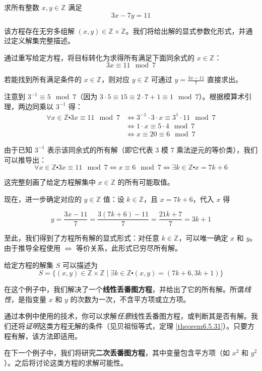 \begin{example}\label{ex:example6.5.26}
    求所有整数 $x, y \in \mathbb{Z}$ 满足
    \[3x - 7y = 11\]

    该方程存在无穷多组解 $(x, y) \in \mathbb{Z} \times \mathbb{Z}$。我们将给出解的显式参数化形式，并通过定义解集完整描述。

    通过重写给定方程，将目标转化为求得所有满足下面同余式的 $x \in \mathbb{Z}$：
    \[3x \equiv 11 \mod 7\]

    若能找到所有满足条件的 $x \in \mathbb{Z}$，则对应 $y \in \mathbb{Z}$ 可通过 $y = \frac{3x-11}{7}$ 直接求出。

    注意到 $3^{-1} \equiv 5 \mod 7$（因为 $3 \cdot 5 \equiv 15 \equiv 2 \cdot 7 + 1 \equiv 1 \mod 7$）。根据模算术引理，两边同乘以 $3^{-1}$ 得：
    \begin{align*}
        \forall x \in \mathbb{Z} \centerdot 3x \equiv 11 \mod 7 &\iff 3^{-1} \cdot 3 \cdot x \equiv 3^{1}
\cdot 11 \mod 7 \\
        &\iff 1 \cdot x \equiv 5 \cdot 4 \mod 7 \\
        &\iff x \equiv 20 \equiv 6 \mod 7
    \end{align*}

    由于已知 $3^{-1}$ 表示该同余式的所有解（即它代表 $3$ 模 $7$ 乘法逆元的等价类），我们可以推导出：
    \[\forall x \in \mathbb{Z} \centerdot 3x \equiv 11 \mod 7 \iff x \equiv 6 \mod 7 \iff \exists k \in \mathbb{Z} \centerdot x = 7k + 6\]

    这完整刻画了给定方程解集中 $x \in \mathbb{Z}$ 的所有可能取值。

    现在，进一步确定对应的 $y \in \mathbb{Z}$ 值：设 $k \in \mathbb{Z}$，且 $x = 7k + 6$，代入 $x$ 得

    \[y = \frac{3x-11}{7} = \frac{3(7k + 6)-11}{7} = \frac{21k+7}{7} = 3k+1\]

    至此，我们得到了方程所有解的显式形式：对任意 $k \in \mathbb{Z}$，可以唯一确定 $x$ 和 $y$。由于推导全程使用 $\iff$ 等价关系，此形式已穷尽所有解。

    给定方程的解集 $S$ 可以描述为
    \[S = \{(x, y) \in \mathbb{Z} \times \mathbb{Z} \mid \exists k \in \mathbb{Z} \centerdot (x, y) = (7k + 6, 3k + 1)\}\]
\end{example}

\begin{tcolorbox}[colback=gray!10,
    colframe=black,
    width=\textwidth,
    arc=2mm, auto outer arc,
    title={有趣的事实},breakable,enhanced jigsaw,
    before upper={\parindent15pt\noindent},	]
    在这个例子中，我们解决了一个\textbf{线性丢番图方程}，并给出了它的所有解。所谓\emph{线性}，是指变量 $x$ 和 $y$ 的次数为一次，不含平方项或立方项。

    通过本例中使用的技术，你可以求解\emph{任意}线性丢番图方程，或判断其是否有解。我们还将\emph{证明}这类方程无解的条件（见贝祖恒等式，定理 \ref{theorem6.5.31}）。只要方程有解，该方法即适用。

    在下一个例子中，我们将研究\textbf{二次丢番图方程}，其中变量包含平方项（如 $x^2$ 和 $y^2$）。之后将讨论这类方程的求解可能性。
\end{tcolorbox}


